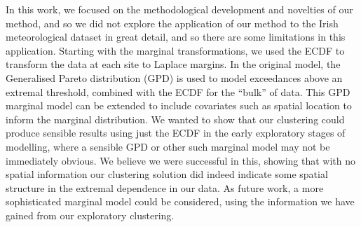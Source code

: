 \documentclass[12pt]{article}
\begin{document}
In this work, we focused on the methodological development and novelties of our method, and so we did not explore the application of our method to the Irish meteorological dataset in great detail, and so there are some limitations in this application.
Starting with the marginal transformations, we used the ECDF to transform the data at each site to Laplace margins.
In the original \citet{Heffernan2004} model, the Generalised Pareto distribution (GPD) is used to model exceedances above an extremal threshold, combined with the ECDF for the ``bulk'' of data. 
This GPD marginal model can be extended to include covariates such as spatial location to inform the marginal distribution.
We wanted to show that our clustering could produce sensible results using just the ECDF in the early exploratory stages of modelling, where a sensible GPD or other such marginal model may not be immediately obvious.
We believe we were successful in this, showing that with no spatial information our clustering solution did indeed indicate some spatial structure in the extremal dependence in our data.
As future work, a more sophisticated marginal model could be considered, using the information we have gained from our exploratory clustering. 
\end{document}
